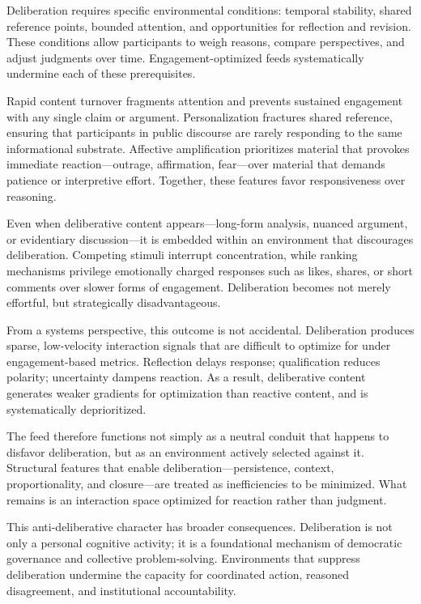 \documentclass[12pt]{article}
\begin{document}
Deliberation requires specific environmental conditions: temporal stability, shared reference points, bounded attention, and opportunities for reflection and revision. These conditions allow participants to weigh reasons, compare perspectives, and adjust judgments over time. Engagement-optimized feeds systematically undermine each of these prerequisites.

Rapid content turnover fragments attention and prevents sustained engagement with any single claim or argument. Personalization fractures shared reference, ensuring that participants in public discourse are rarely responding to the same informational substrate. Affective amplification prioritizes material that provokes immediate reaction—outrage, affirmation, fear—over material that demands patience or interpretive effort. Together, these features favor responsiveness over reasoning.

Even when deliberative content appears—long-form analysis, nuanced argument, or evidentiary discussion—it is embedded within an environment that discourages deliberation. Competing stimuli interrupt concentration, while ranking mechanisms privilege emotionally charged responses such as likes, shares, or short comments over slower forms of engagement. Deliberation becomes not merely effortful, but strategically disadvantageous.

From a systems perspective, this outcome is not accidental. Deliberation produces sparse, low-velocity interaction signals that are difficult to optimize for under engagement-based metrics. Reflection delays response; qualification reduces polarity; uncertainty dampens reaction. As a result, deliberative content generates weaker gradients for optimization than reactive content, and is systematically deprioritized.

The feed therefore functions not simply as a neutral conduit that happens to disfavor deliberation, but as an environment actively selected against it. Structural features that enable deliberation—persistence, context, proportionality, and closure—are treated as inefficiencies to be minimized. What remains is an interaction space optimized for reaction rather than judgment.

This anti-deliberative character has broader consequences. Deliberation is not only a personal cognitive activity; it is a foundational mechanism of democratic governance and collective problem-solving. Environments that suppress deliberation undermine the capacity for coordinated action, reasoned disagreement, and institutional accountability.
\end{document}
